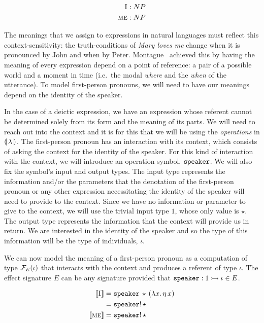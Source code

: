 \begin{align*}
\textsc{I} &: NP \\
\textsc{me} &: NP
\end{align*}

The meanings that we assign to expressions in natural languages must
reflect this context-sensitivity: the truth-conditions of \emph{Mary loves
  me} change when it is pronounced by John and when by
Peter. Montague~\cite{montague1973proper} achieved this by having the
meaning of every expression depend on a point of reference: a pair of a
possible world and a moment in time (i.e.\ the modal \emph{where} and the
\emph{when} of the utterance). To model first-person pronouns, we will need
to have our meanings depend on the identity of the speaker.

In the case of a deictic expression, we have an expression whose referent
cannot be determined solely from its form and the meaning of its parts. We
will need to reach out into the context and it is for this that we will be
using the \emph{operations} in $\llparenthesis \, \lambda \, \rrparenthesis$. The first-person pronoun
has an interaction with its context, which consists of asking the context
for the identity of the speaker. For this kind of interaction with the
context, we will introduce an operation symbol, $\mathtt{speaker}$. We will
also fix the symbol's input and output types. The input type represents the
information and/or the parameters that the denotation of the first-person
pronoun or any other expression necessitating the identity of the speaker
will need to provide to the context. Since we have no information or
parameter to give to the context, we will use the trivial input type $1$,
whose only value is $\star$. The output type represents the information
that the context will provide us in return. We are interested in the
identity of the speaker and so the type of this information will be the
type of individuals, $\iota$.

We can now model the meaning of a first-person pronoun as a computation of
type $\mathcal{F}_E(\iota)$ that interacts with the context and produces a referent
of type $\iota$. The effect signature $E$ can be any signature provided
that $\mathtt{speaker} : 1 \rightarrowtail \iota \in E$.

\begin{align*}
  \llbracket \textsc{I} \rrbracket &= \mathtt{speaker}\,\star\,(\lambda x.\, \eta\,x) \\
  &= \mathtt{speaker}!\,\star \\
  \llbracket \textsc{me} \rrbracket &= \mathtt{speaker}!\,\star
\end{align*}

